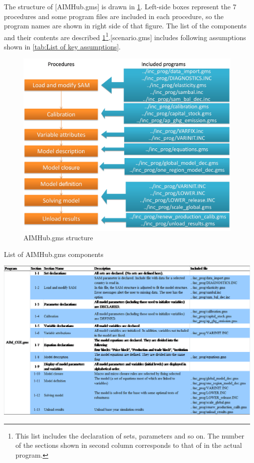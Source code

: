\documentclass[10pt,a4paper,titlepage,dvipdfmx]{book}
\begin{document}
The structure of [AIMHub.gms] is drawn in \ref{fig:AIMCGEStruc}. Left-side boxes represent the 7 procedures and some program files are included in each procedure, so the program names are shown in right side of that figure. The list of the components and their contents are described \ref{fig:AIMCGEStruc}\footnote{This list includes the declaration of sets, parameters and so on. The number of the sections shown in second column corresponds to that of in the actual program.}.[scenario.gms] includes following assumptions shown in \ref{tab:List of key assumptions}.
\begin{figure}
\includegraphics[width=1\textwidth]{fig/picture1.png}
\caption{\label{fig:AIMCGEStruc}AIMHub.gms structure}
\end{figure}

\begin{table}
\caption{\label{AIMCGE.gmscomponents}List of AIMHub.gms components}\includegraphics[width=1\textwidth]{fig/image12.png}
\end{table}
\end{document}
